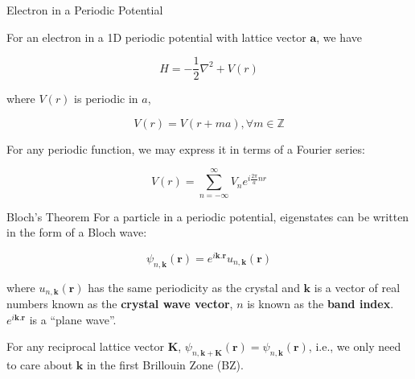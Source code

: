 \documentclass[aspectratio=169]{beamer}
\let \vec \mathbf
\begin{document}
    \begin{frame}{Electron in a Periodic Potential}

        For an electron in a 1D periodic potential with lattice vector $\vec{a}$, we have

        \begin{equation*}
            H = - \frac{1}{2} \nabla^2 + V(r)
        \end{equation*}

        where $V(r)$ is periodic in $a$,

        \begin{equation*}
            V(r) = V(r + ma), \forall m \in \mathbb{Z}
        \end{equation*}

        For any periodic function, we may express it in terms of a Fourier series:

        \begin{equation*}
            V(r) = \sum_{n=-\infty}^{\infty} V_n e^{i\frac{2\pi}{a}nr}
        \end{equation*}


    \end{frame}

    \begin{frame}{Bloch's Theorem}
        For a particle in a periodic potential, eigenstates can be written in the form of a Bloch wave:

        \begin{equation*}
            \psi_{n,\vec{k}}(\vec{r}) = e^{i\vec{k}.\vec{r}}u_{n,\vec{k}}(\vec{r})
        \end{equation*}

        where $u_{n,\vec{k}}(\vec{r})$ has the same periodicity as the crystal and $\vec{k}$ is a vector of real numbers known as the \textbf{crystal wave vector}, $n$ is known as the \textbf{band index}. $e^{i\vec{k}.\vec{r}}$ is a ``plane wave''.\newline
        \newline

        For any reciprocal lattice vector $\vec{K}$, $\psi_{n,\vec{k}+\vec{K}}(\vec{r}) = \psi_{n,\vec{k}}(\vec{r})$, i.e., we only need to care about $\vec{k}$ in the first Brillouin Zone (BZ).

    \end{frame}
\end{document}
